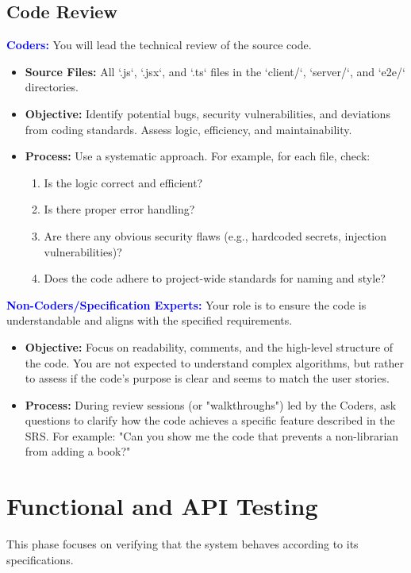 \documentclass{article}
\newcommand{\role}[1]{\textbf{\textcolor{blue}{#1:}}}
\begin{document}
\subsection{Code Review}
\role{Coders}
You will lead the technical review of the source code.
\begin{itemize}
    \item \textbf{Source Files:} All `.js`, `.jsx`, and `.ts` files in the `client/`, `server/`, and `e2e/` directories.
    \item \textbf{Objective:} Identify potential bugs, security vulnerabilities, and deviations from coding standards. Assess logic, efficiency, and maintainability.
    \item \textbf{Process:} Use a systematic approach. For example, for each file, check:
    \begin{enumerate}
        \item Is the logic correct and efficient?
        \item Is there proper error handling?
        \item Are there any obvious security flaws (e.g., hardcoded secrets, injection vulnerabilities)?
        \item Does the code adhere to project-wide standards for naming and style?
    \end{enumerate}
\end{itemize}

\role{Non-Coders/Specification Experts}
Your role is to ensure the code is understandable and aligns with the specified requirements.
\begin{itemize}
    \item \textbf{Objective:} Focus on readability, comments, and the high-level structure of the code. You are not expected to understand complex algorithms, but rather to assess if the code's purpose is clear and seems to match the user stories.
    \item \textbf{Process:} During review sessions (or "walkthroughs") led by the Coders, ask questions to clarify how the code achieves a specific feature described in the SRS. For example: "Can you show me the code that prevents a non-librarian from adding a book?"
\end{itemize}


\section{Functional and API Testing}
This phase focuses on verifying that the system behaves according to its specifications.
\end{document}
